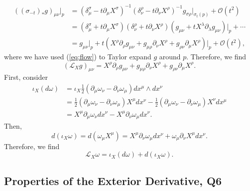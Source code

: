 \begin{solution}
\begin{equation}
\begin{aligned}
        ((\sigma_{-t}) _*g)_{\mu\nu}\bigg|_p &= (\delta^\sigma_\mu - t\partial_\mu X^\sigma)^{-1}(\delta^\rho_\nu - t\partial_\nu X^\rho)^{-1}g_{\sigma\rho}\bigg|_{\sigma_t(p)} + \mathcal{O}(t^2)   \\
        &= (\delta^\sigma_\mu + t\partial_\mu X^\sigma)(\delta^\rho_\nu + t\partial_\nu X^\rho)\left(g_{\mu\nu} + tX^\lambda\partial_\lambda g_{\mu\nu}\right)\bigg|_p + \cdots\\
        &=g_{\mu\nu}\bigg|_p + t(X^\rho\partial_\rho g_{\mu\nu} + g_{\mu\rho}\partial_\nu X^\rho + g_{\rho\nu}\partial_\mu X^\rho)\bigg|_p + \mathcal{O}(t^2),
    \end{aligned}
    \end{equation}
    where we have used (\ref{eq:flow}) to Taylor expand $g$ around $p$. Therefore, we find
    \begin{equation}
        (\mathcal{L}_X g)_{\mu\nu} = X^\rho\partial_\rho g_{\mu\nu} + g_{\mu\rho}\partial_\nu X^\rho + g_{\rho\nu}\partial_\mu X^\rho.
    \end{equation}
    First, consider
    \begin{equation}
    \begin{aligned}
        \iota_X(d\omega) &= \iota_X\frac{1}{2}(\partial_\mu\omega_\nu - \partial_\nu \omega_\mu) dx^\mu \wedge dx^\nu \\&= \frac{1}{2}(\partial_\mu\omega_\nu - \partial_\nu \omega_\mu)X^\mu dx^\nu - \frac{1}{2}(\partial_\mu\omega_\nu - \partial_\nu \omega_\mu)X^\nu dx^\mu\\& = X^\mu\partial_\mu\omega_\nu dx^\nu - X^\mu \partial_\nu\omega_\mu dx^\nu.
    \end{aligned}
    \end{equation}
    Then, 
    \begin{equation}
        d(\iota_X\omega) = d(\omega_\mu X^\mu) = X^\mu\partial_\nu\omega_\mu dx^\nu +  \omega_\mu \partial_\nu X^\mu dx^\nu.
    \end{equation}
    Therefore, we find
    \begin{equation}
        \mathcal{L}_X\omega = \iota_X(d\omega) + d(\iota_X\omega).   
    \end{equation}

\end{solution}

\subsection{Properties of the Exterior Derivative, Q6}

